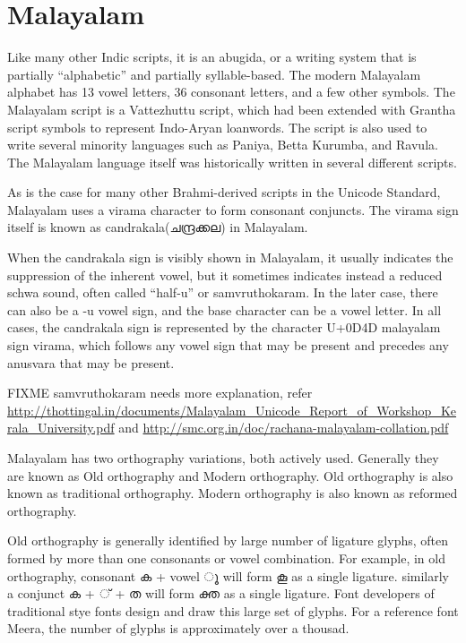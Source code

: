 \chapter{Malayalam}

Like many other Indic scripts, it is an abugida, or a writing system
that is partially “alphabetic” and partially syllable-based. The
modern Malayalam alphabet has 13 vowel letters, 36 consonant letters,
and a few other symbols. The Malayalam script is a Vattezhuttu script,
which had been extended with Grantha script symbols to represent
Indo-Aryan loanwords. The script is also used to write several
minority languages such as Paniya, Betta Kurumba, and Ravula. The
Malayalam language itself was historically written in several
different scripts.

As is the case for many other Brahmi-derived scripts in the Unicode
Standard, Malayalam uses a virama character to form consonant
conjuncts. The virama sign itself is known as candrakala({\meera ചന്ദ്രക്കല}) in
Malayalam.

When the candrakala sign is visibly shown in Malayalam, it usually
indicates the suppression of the inherent vowel, but it sometimes
indicates instead a reduced schwa sound, often called “half-u” or
samvruthokaram. In the later case, there can also be a -u vowel sign,
and the base character can be a vowel letter. In all cases, the
candrakala sign is represented by the character U+0D4D malayalam sign
virama, which follows any vowel sign that may be present and precedes
any anusvara that may be present.

FIXME samvruthokaram needs more explanation, refer
{\url{http://thottingal.in/documents/Malayalam_Unicode_Report_of_Workshop_Kerala_University.pdf}}
and {\url{http://smc.org.in/doc/rachana-malayalam-collation.pdf}}


Malayalam has two orthography variations, both actively
used. Generally they are known as Old orthography and Modern
orthography. Old orthography is also known as traditional
orthography. Modern orthography is also known as reformed orthography.

Old orthography is generally identified by large number of ligature
glyphs, often formed by more than one consonants or vowel
combination. For example, in old orthography, consonant {\meera ക} +
vowel { \meera ൂ} will form കൂ as a single ligature. similarly a
conjunct {\meera ക + ് + ത} will form {\meera ക്ത} as a single
ligature. Font developers of traditional stye fonts design and draw
this large set of glyphs. For a reference font Meera, the number of
glyphs is approximately over a thousad.


